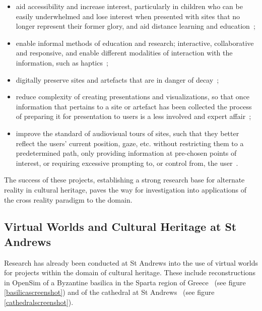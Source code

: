 \documentclass{sig-alternate}
\begin{document}
{\begin{itemize}
	\item aid accessibility and increase interest, particularly in children who can be easily underwhelmed and lose interest when presented with sites that no longer represent their former glory, and aid distance learning and education~\cite{deamicis:gamebased, ardito:combining, Seo2010, Kim2009, roussou:photorealism};

	\item enable informal methods of education and research; interactive, collaborative and responsive, and enable different modalities of interaction with the information, such as haptics~\cite{deamicis:gamebased, Christou2006, benko:collaborative};

	\item digitally preserve sites and artefacts that are in danger of decay~\cite{Ikeuchi2003, Remondino2009, Levoy1999, levoy:digitalmichelangelolong};

	\item reduce complexity of creating presentations and visualizations, so that once information that pertains to a site or artefact has been collected the process of preparing it for presentation to users is a less involved and expert affair~\cite{Ruffaldi2008, roussou:photorealism};

	\item improve the standard of audiovisual tours of sites, such that they better reflect the users' current position, gaze, etc. without restricting them to a predetermined path, only providing information at pre-chosen points of interest, or requiring excessive prompting to, or control from, the user~\cite{Seo2010, Kim2009, vlahakis:archeoguide}.
\end{itemize}

The success of these projects, establishing a strong research base for alternate reality in cultural heritage, paves the way for investigation into applications of the cross reality paradigm to the domain.

\subsection{Virtual Worlds and Cultural Heritage at St Andrews}
Research has already been conducted at St Andrews into the use of virtual worlds for projects within the domain of cultural heritage. These include reconstructions in OpenSim of a Byzantine basilica in the Sparta region of Greece~\cite{Getchell2010} (see figure \ref{basilicascreenshot}) and of the cathedral at St Andrews~\cite{UniversityofStAndrewsComputerScienceblog2011} (see figure \ref{cathedralscreenshot}).

}
\end{document}
